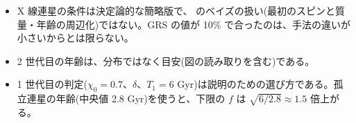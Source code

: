 \begin{caveat}
\begin{itemize}
\item X 線連星の条件は決定論的な簡略版で、 のベイズの扱い(最初のスピンと質量・年齢の周辺化)ではない。GRS の値が 10\% で合ったのは、手法の違いが小さいからとは限らない。
\item 2 世代目の年齢は、分布ではなく目安(図の読み取りを含む)である。
\item 1 世代目の判定($\chi_0=0.7$、$\delta$、$T_1=6$ Gyr)は説明のための選び方である。孤立連星の年齢(中央値 2.8 Gyr)を使うと、下限の $f$ は $\sqrt{6/2.8}\approx1.5$ 倍上がる。
\end{itemize}
\end{caveat}

